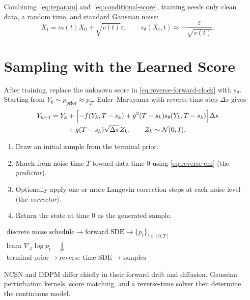 \documentclass[11pt,a4paper]{article}
\newcommand{\cN}{\mathcal{N}}
\newcommand{\pprior}{p_{\mathrm{prior}}}
\begin{document}
Combining~\eqref{eq:reparam} and~\eqref{eq:conditional-score}, training needs
only clean data, a random time, and standard Gaussian noise:
\[
  X_t=m(t)X_0+\sqrt{v(t)}\varepsilon,
  \qquad
  s_\theta(X_t,t)\approx-\frac{\varepsilon}{\sqrt{v(t)}}.
\]

\section{Sampling with the Learned Score}\label{sec:sampling}

After training, replace the unknown score in
\eqref{eq:reverse-forward-clock} with $s_\theta$.  Starting from
$Y_0\sim\pprior\approx p_T$, Euler--Maruyama with reverse-time step $\Delta s$
gives
\begin{align}\label{eq:reverse-em}
  Y_{k+1}
  ={}&Y_k+\Bigl[-f(Y_k,T-s_k)
      +g^2(T-s_k)s_\theta(Y_k,T-s_k)\Bigr]\Delta s \\
     &\quad+g(T-s_k)\sqrt{\Delta s}\,Z_k,
  \qquad Z_k\sim\cN(0,I).
\end{align}

\begin{enumerate}[label=\textbf{\arabic*.},nosep]
  \item Draw an initial sample from the terminal prior.
  \item March from noise time $T$ toward data time $0$ using
        \eqref{eq:reverse-em} (the \emph{predictor}).
  \item Optionally apply one or more Langevin correction steps at each noise
        level (the \emph{corrector}).
  \item Return the state at time $0$ as the generated sample.
\end{enumerate}

\begin{tcolorbox}[
  enhanced,colback=mydarkblue!4,colframe=mydarkblue!45,
  arc=3pt,boxrule=0.6pt,title={\bfseries Framework in one line},
  fonttitle=\small,top=2pt,bottom=2pt
]
\centering
{\small$\boxed{\begin{gathered}
    \text{discrete noise schedule}
    \longrightarrow \text{forward SDE}
    \longrightarrow \{p_t\}_{t\in[0,T]} \\
    \scriptstyle \text{learn }\nabla_x\log p_t
    \quad\Downarrow\quad \\
    \text{terminal prior}
    \longrightarrow \text{reverse-time SDE}
    \longrightarrow \text{samples}
  \end{gathered}}$}\par\smallskip
\raggedright\small
NCSN and DDPM differ chiefly in their forward drift and diffusion.  Gaussian
perturbation kernels, score matching, and a reverse-time solver then determine
the continuous model.
\end{tcolorbox}
\end{document}
